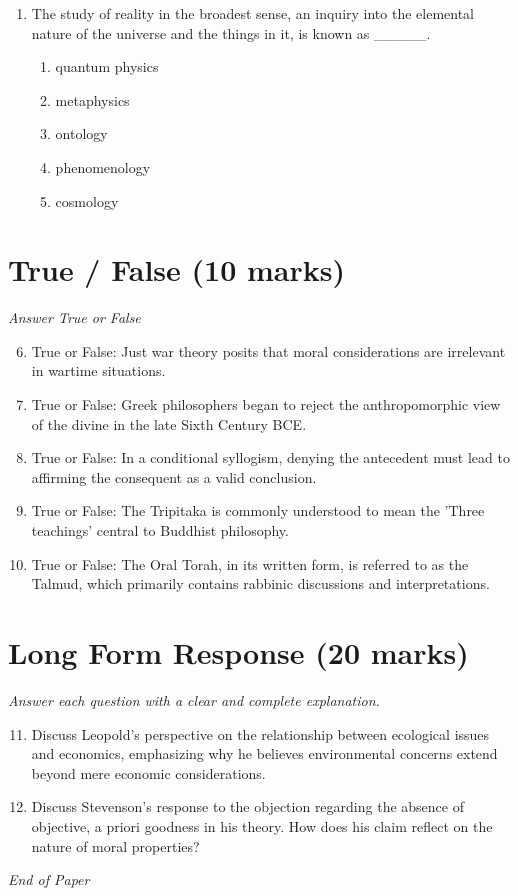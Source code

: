 \documentclass[12pt]{article}
\begin{document}
\begin{enumerate}[label=\arabic*.]
\begin{enumerate}[label=(\alph*)]
    \item the effects of engineering children to have positional goods
    \item loss of equality of opportunity
    \item increased disparity between the rich and the poor
\end{enumerate}
\item The study of reality in the broadest sense, an inquiry into the elemental nature of the universe and the things in it, is known as \_\_\_\_\_.
\begin{enumerate}[label=(\alph*)]
    \item quantum physics
    \item metaphysics
    \item ontology
    \item phenomenology
    \item cosmology
\end{enumerate}
\end{enumerate}

\section*{True / False (10 marks)}
\textit{Answer True or False}
\begin{enumerate}[label=\arabic*.]
\setcounter{enumi}{5}
\item True or False: Just war theory posits that moral considerations are irrelevant in wartime situations.
\item True or False: Greek philosophers began to reject the anthropomorphic view of the divine in the late Sixth Century BCE.
\item True or False: In a conditional syllogism, denying the antecedent must lead to affirming the consequent as a valid conclusion.
\item True or False: The Tripitaka is commonly understood to mean the 'Three teachings' central to Buddhist philosophy.
\item True or False: The Oral Torah, in its written form, is referred to as the Talmud, which primarily contains rabbinic discussions and interpretations.
\end{enumerate}

\section*{Long Form Response (20 marks)}
\textit{Answer each question with a clear and complete explanation.}
\begin{enumerate}[label=\arabic*.]
\setcounter{enumi}{10}
\item Discuss Leopold's perspective on the relationship between ecological issues and economics, emphasizing why he believes environmental concerns extend beyond mere economic considerations.
\item Discuss Stevenson's response to the objection regarding the absence of objective, a priori goodness in his theory. How does his claim reflect on the nature of moral properties?
\end{enumerate}

\vfill
\noindent\textit{End of Paper}
\end{document}
